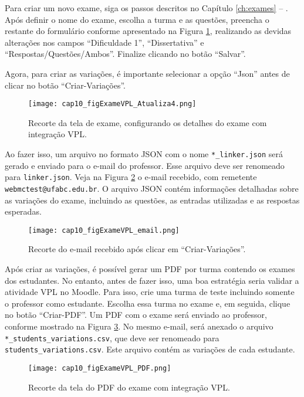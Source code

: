 Para criar um novo exame, siga os passos descritos no Capítulo \ref{ch:exames} -- . Após definir o nome do exame, escolha a turma e as questões, preencha o restante do formulário conforme apresentado na Figura \ref{fig:cap10_figExameVPL_Atualiza4}, realizando as devidas alterações nos campos  ``Dificuldade 1'', ``Dissertativa'' e ``Respostas/Questões/Ambos''. Finalize clicando no botão ``Salvar''.

Agora, para criar as variações, é importante selecionar a opção ``Json'' antes de clicar no botão ``Criar-Variações''.

\begin{figure}[htbp]
  \centering
  \texttt{[image: cap10\_figExameVPL\_Atualiza4.png]}
  \caption{Recorte da tela de exame, configurando os detalhes do exame com integração VPL.}
  \label{fig:cap10_figExameVPL_Atualiza4}
\end{figure}

Ao fazer isso, um arquivo no formato JSON com o nome \verb|*_linker.json| será gerado e enviado para o e-mail do professor. Esse arquivo deve ser renomeado para \verb|linker.json|. Veja na Figura \ref{fig:cap10_figExameVPL_email} o e-mail recebido, com remetente \verb|webmctest@ufabc.edu.br|. O arquivo JSON contém informações detalhadas sobre as variações do exame, incluindo as questões, as entradas utilizadas e as respostas esperadas.

\begin{figure}[htbp]
  \centering
  \texttt{[image: cap10\_figExameVPL\_email.png]}
   \caption{Recorte do e-mail recebido após clicar em ``Criar-Variações''.}
  \label{fig:cap10_figExameVPL_email}
\end{figure}

Após criar as variações, é possível gerar um PDF por turma contendo os exames dos estudantes. No entanto, antes de fazer isso, uma boa estratégia seria validar a atividade VPL no Moodle. Para isso, crie uma turma de teste incluindo somente o professor como estudante. Escolha essa turma no exame e, em seguida, clique no botão ``Criar-PDF''. Um PDF com o exame será enviado ao professor, conforme mostrado na Figura \ref{fig:cap10_figExameVPL_PDF}.
No mesmo e-mail, será anexado o arquivo \verb|*_students_variations.csv|, que deve ser renomeado para \verb|students_variations.csv|. Este arquivo contém as variações de cada estudante.

\begin{figure}[htbp]
  \centering
  \texttt{[image: cap10\_figExameVPL\_PDF.png]}
  \caption{Recorte da tela do PDF do exame com integração VPL.}
  \label{fig:cap10_figExameVPL_PDF}
\end{figure}

